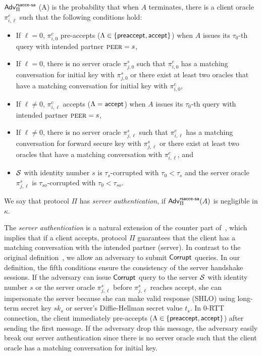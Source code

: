 \begin{definition} \label{def:rsacce-sa}
 $\mathsf{Adv}^{\mathsf{rsacce\textsc{-} sa}}_{\Pi}$ (A) is the probability that when
 $A$ terminates, there is a client oracle $\pi^c_{i, \ell}$
 such that the following conditions hold:
 \begin{itemize}
  \item{If $\ell = 0$, $\pi^c_{i, 0}$ pre-accepts
  ($\Lambda \in \{\mathsf{preaccept}, \mathsf{accept} \}$) when $A$ issues its
  $\tau_0$-th query with intended partner $\textsc{peer}=s$, }

  \item{If $\ell = 0$, there is no server oracle
  $\pi^s_{j, 0}$ such
  that $\pi^c_{i,0}$ has a matching conversation for initial
  key with
  $\pi^s_{j,0}$ or there exist at least two oracles that have
  a matching conversation for initial key with $\pi^c_{i,0}$,}

  \item{If $\ell \neq 0$, $\pi^c_{i, \ell}$
  accepts ($\Lambda = \mathsf{accept}$) when $A$ issues its
  $\tau_0$-th query with intended partner $\textsc{peer}=s$, }

  \item{If $\ell \neq 0$, there is no server oracle
  $\pi^s_{j, \ell}$ such
  that $\pi^c_{i,\ell}$ has a matching conversation for forward
  secure key with
  $\pi^s_{j,\ell}$ or there exist at least two oracles that have
  a matching conversation with $\pi^c_{i,\ell}$, and}

  \item{$\mathcal{S}$ with identity number $s$ is $\tau_{s}$-corrupted with
  $\tau_0 < \tau_{s}$ and the server oracle $\pi^s_{j, \ell}$ is
  $\tau_{so}$-corrupted with $\tau_0 < \tau_{so}$. }

 \end{itemize}
 We say that protocol $\Pi$ has \textit{server authentication},
 if $\mathsf{Adv}^{\mathsf{rsacce\textsc{-} sa}}_{\Pi}(A)$ is negligible in $\kappa$.
\end{definition}

\begin{remark}
 The \textit{server authentication} is a natural extension
 of the counter part of~\cite{KPW13:SACCE}, which implies
 that if a client accepts, protocol $\Pi$ guarantees that
 the client has a matching conversation with the intended
 partner (server). In contrast to the original
 definition~\cite{KPW13:SACCE}, we allow an adversary to
 submit $\mathsf{Corrupt}$ queries.
 In our definition, the fifth conditions ensure the
 consistency of the server handshake sessions.
 If the adversary can issue $\mathsf{Corrupt}$ query to the server
 $\mathcal{S}$ with identity number $s$ or the server oracle $\pi^s_{j, \ell}$
 before $\pi^s_{j, \ell}$ reaches accept, she can
 impersonate the server because she can make valid response
 (SHLO) using long-term secret key $sk_s$ or server's
 Diffie-Hellman secret value $t_s$.
 In 0-RTT connection, the client immediately pre-accepts ($\Lambda \in \{\mathsf{preaccept}, \mathsf{accept} \}$)
 after sending the first message. If the adversary drop this message, the adversary
 easily break our server authentication since there is no server oracle
 such that the client oracle has a matching conversation for initial key.

 \end{remark}

